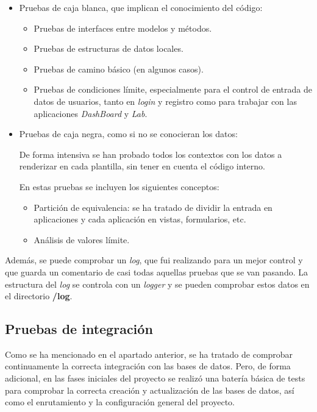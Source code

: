 \begin{itemize}
\item
Pruebas de caja blanca, que implican el conocimiento del código:
\begin{itemize}
\item 
Pruebas de interfaces entre modelos y métodos.
\item
Pruebas de estructuras de datos locales. 
\item
Pruebas de camino básico (en algunos casos).
\item
Pruebas de condiciones límite, especialmente para el control de entrada de datos de usuarios, tanto en \emph{login} y registro como para trabajar con las aplicaciones \emph{DashBoard} y \emph{Lab}. 
\end{itemize}

\item
Pruebas de caja negra, como si no se conocieran los datos:

De forma intensiva se han probado todos los contextos con los datos a renderizar en cada plantilla, sin tener en cuenta el código interno.

En estas pruebas se incluyen los siguientes conceptos:

\begin{itemize}
\item 
Partición de equivalencia: se ha tratado de dividir la entrada en aplicaciones y cada aplicación en vistas, formularios, etc. 
\item
Análisis de valores límite. 
\end{itemize}
\end{itemize}

Además, se puede comprobar un \emph{log}, que fui realizando para un mejor control y que guarda un comentario de casi todas aquellas pruebas que se van pasando. La estructura del \emph{log} se controla con un \emph{logger} y se pueden comprobar estos datos en el directorio \textbf{/log}.



\subsection{Pruebas de integración}

Como se ha mencionado en el apartado anterior, se ha tratado de comprobar continuamente la correcta integración con las bases de datos. Pero, de forma adicional, en las fases iniciales del proyecto se realizó una batería básica de tests para comprobar la correcta creación y actualización de las bases de datos, así como el enrutamiento y la configuración general del proyecto.

